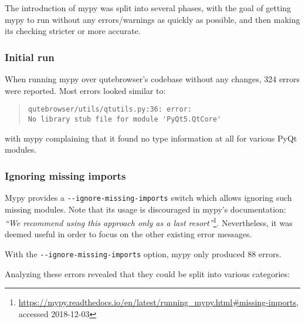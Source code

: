 The introduction of mypy was split into several phases, with the goal of getting
mypy to run without any errors/warnings as quickly as possible, and then making
its checking stricter or more accurate.

\subsubsection{Initial run}
When running mypy over qutebrowser's codebase without any changes, 324 errors
were reported. Most errors looked similar to:

\begin{quote}
\begin{verbatim}
qutebrowser/utils/qtutils.py:36: error:
No library stub file for module 'PyQt5.QtCore'
\end{verbatim}
\end{quote}

with mypy complaining that it found no type information at all for various PyQt
modules.

\subsubsection{Ignoring missing imports}

Mypy provides a \verb|--ignore-missing-imports| switch which allows ignoring
such missing modules. Note that its usage is discouraged in mypy's documentation:
\emph{``We recommend using this approach only as a last resort''}\footnote{\url{https://mypy.readthedocs.io/en/latest/running_mypy.html\#missing-imports},
accessed 2018-12-03}. Nevertheless, it was deemed useful in order to focus on
the other existing error messages.

With the \verb|--ignore-missing-imports| option, mypy only produced 88 errors.

Analyzing these errors revealed that they could be split into various
categories:

